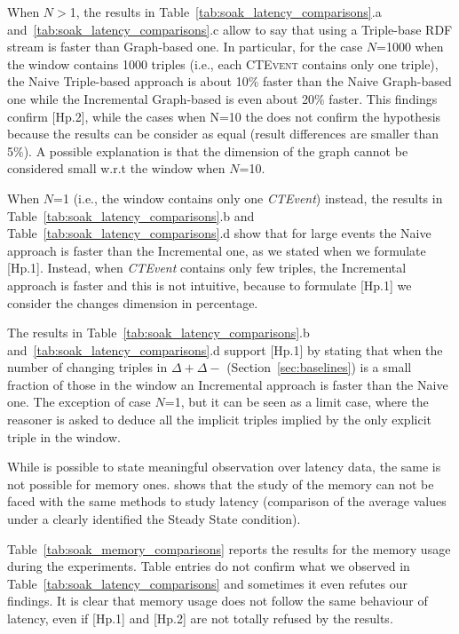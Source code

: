 

When $N>$1, the results in Table~\ref{tab:soak_latency_comparisons}.a and~\ref{tab:soak_latency_comparisons}.c allow to say that using a Triple-base RDF stream is faster than Graph-based one. In particular, for the case $N$=1000 when the window contains 1000 triples (i.e., each \textsc{CTEvent} contains only one triple),  the Naive Triple-based approach is about 10\% faster  than the Naive Graph-based one while the Incremental Graph-based is even about 20\% faster. This findings confirm [Hp.2], while the cases  when N=10 the does not confirm the hypothesis because the results can be consider as equal (result differences are smaller than 5\%). A possible explanation is that the dimension of the graph cannot be considered small w.r.t the window when $N$=10.

When $N$=1 (i.e., the window contains only one \textit{CTEvent}) instead, the results in Table~\ref{tab:soak_latency_comparisons}.b and Table~\ref{tab:soak_latency_comparisons}.d show that for large events the Naive approach is faster than the Incremental one, as we stated when we formulate [Hp.1]. Instead, when \textit{CTEvent} contains only few triples, the Incremental approach is faster and this is not intuitive, because to formulate [Hp.1] we consider the changes dimension in percentage.

The results in Table~\ref{tab:soak_latency_comparisons}.b and~\ref{tab:soak_latency_comparisons}.d support [Hp.1] by stating that when the number of changing triples in $\Delta+ \Delta-$ (Section~\ref{sec:baselines}) is a small fraction of those in the window an Incremental approach is faster than the Naive one. The exception of case $N$=1, but it can be seen as a limit case, where the reasoner is asked to deduce all the implicit triples implied by the only explicit triple in the window.  

While is possible to state meaningful observation over latency data, the same is not possible for memory ones. \name shows that the study of the memory can not be faced with the same methods to study latency (comparison of the average values under a clearly identified the Steady State condition). 

Table~\ref{tab:soak_memory_comparisons} reports the results for the memory usage during the experiments. Table entries do not confirm what we observed in Table~\ref{tab:soak_latency_comparisons} and sometimes it even refutes our findings. It is clear that memory usage does not follow the same behaviour of latency, even if [Hp.1] and [Hp.2] are not totally refused by the results.


